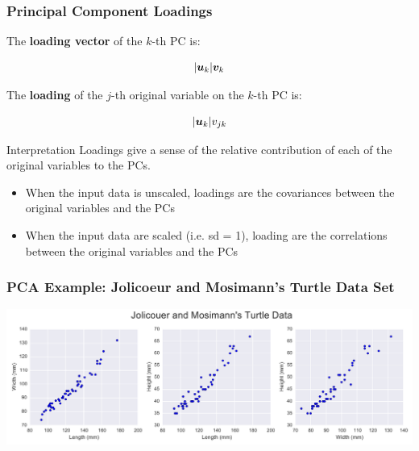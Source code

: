 \documentclass{beamer}
\begin{document}
\begin{frame}
  \frametitle{Principal Component Loadings}

The \textbf{loading vector} of the $k$-th PC is:

\[
|\bm{u}_k|\bm{v}_k
\]

The \textbf{loading} of the $j$-th original variable on the $k$-th PC is:

\[
|\bm{u}_k|v_{jk}
\]

\begin{block}{Interpretation}
Loadings give a sense of the relative contribution of each of the original variables to the PCs.

\begin{itemize}
    \item When the input data is unscaled, loadings are the covariances between the original variables and the PCs
    \item When the input data are scaled (i.e. sd = 1), loading are the correlations between the original variables and the PCs
\end{itemize}

\end{block}

\end{frame}

\begin{frame}[fragile]
  \frametitle{PCA Example: Jolicoeur and Mosimann's Turtle Data Set}

\begin{center}
\hspace*{-0.8cm}
\includegraphics[width=0.95\paperwidth]{turtles.pdf}
\end{center}
\end{frame}

\end{document}
